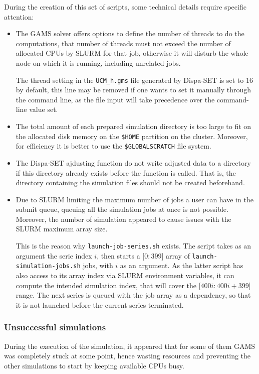During the creation of this set of scripts, some technical details require specific attention:
\begin{itemize}
    \item The GAMS solver offers options to define the number of threads to do the computations, that number of threads must not exceed the number of allocated CPUs by SLURM for that job, otherwise it will disturb the whole node on which it is running, including unrelated jobs.
    
    The thread setting in the \texttt{UCM\_h.gms} file generated by Dispa-SET is set to 16 by default, this line may be removed if one wants to set it manually through the command line, as the file input will take precedence over the command-line value set.
    \item The total amount of each prepared simulation directory is too large to fit on the allocated disk memory on the \texttt{\$HOME} partition on the cluster. Moreover, for efficiency it is better to use the \texttt{\$GLOBALSCRATCH} file system.
    \item The Dispa-SET ajdusting function do not write adjusted data to a directory if this directory already exists before the function is called. That is, the directory containing the simulation files should not be created beforehand.
    \item Due to SLURM limiting the maximum number of jobs a user can have in the submit queue, queuing all the simulation jobs at once is not possible. Moreover, the number of simulation appeared to cause issues with the SLURM maximum array size.

    This is the reason why \texttt{launch-job-series.sh} exists. The script takes as an argument the serie index $i$, then starts a [$0:399$] array of \texttt{launch-simulation-jobs.sh} jobs, with $i$ as an argument. As the latter script has also access to its array index via SLURM environment variables, it can compute the intended simulation index, that will cover the [$400i:400i+399$] range. The next series is queued with the job array as a dependency, so that it is not launched before the current series terminated.
\end{itemize}

\subsubsection{Unsuccessful simulations}

During the execution of the simulation, it appeared that for some of them GAMS was completely stuck at some point, hence wasting resources and preventing the other simulations to start by keeping available CPUs busy.

